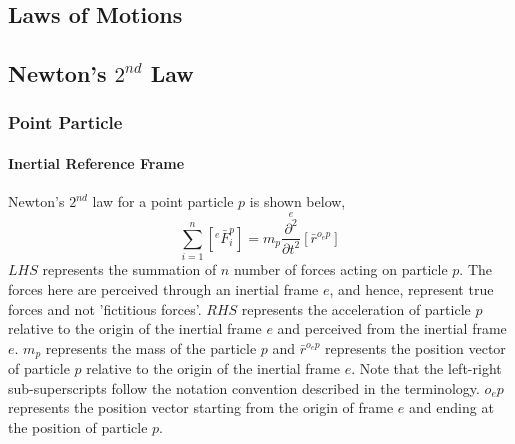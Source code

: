 \documentclass[class=report, 12pt, crop=false]{standalone}
\begin{document}
\begin{center}
\chapter{Laws of Motions}
\begin{comment}
Probably should rename rigid body to system of particles. There has to be a distinction between the two. Rigid bodies have the constraint that particles cannot move with respect to one another meanwhile for a system of particles, particles can still move relative to one another. Think of an aircraft as a rigid body meanwhile the earth and moon as a system of particles.


\end{comment}
\section{Newton's $2^{nd}$ Law}
\begin{comment}
\end{comment}
\subsection{Point Particle}
\begin{comment}
\end{comment}
\subsubsection{Inertial Reference Frame}
\begin{comment}
\end{comment}
Newton's $2^{nd}$ law for a point particle $p$ is shown below,
$$\sum^{n}_{i = 1}\left[{}^{e}\bar{F}^{p}_{i}\right] = m_{p}\overset{e}{\frac{\partial^{2}}{\partial t^{2}}}[\bar{r}^{o_{e}p}]$$
$LHS$ represents the summation of $n$ number of forces acting on particle $p$. The forces here are perceived through an inertial frame $e$, and hence, represent true forces and not 'fictitious forces'. $RHS$ represents the acceleration of particle $p$ relative to the origin of the inertial frame $e$ and perceived from the inertial frame $e$. $m_{p}$ represents the mass of the particle $p$ and $\bar{r}^{o_{e}p}$ represents the position vector of particle $p$ relative to the origin of the inertial frame $e$. Note that the left-right sub-superscripts follow the notation convention described in the terminology. $o_{e}p$ represents the position vector starting from the origin of frame $e$ and ending at the position of particle $p$. 

\end{center}
\end{document}
